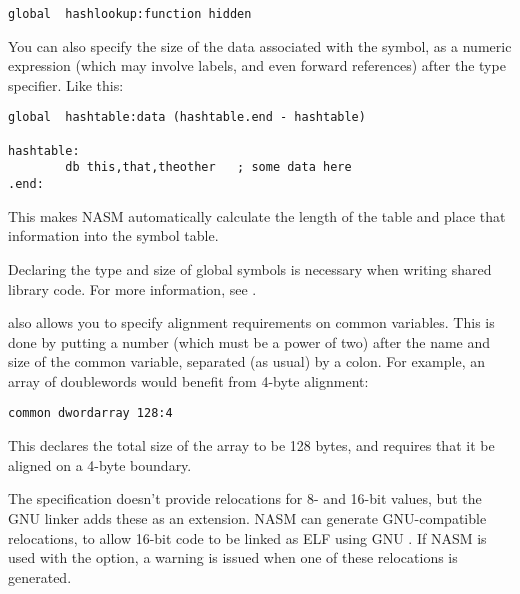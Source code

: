 \begin{lstlisting}
global  hashlookup:function hidden
\end{lstlisting}

You can also specify the size of the data associated with the
symbol, as a numeric expression (which may involve labels, and even
forward references) after the type specifier. Like this:

\begin{lstlisting}
global  hashtable:data (hashtable.end - hashtable)

hashtable:
        db this,that,theother   ; some data here
.end:
\end{lstlisting}

This makes NASM automatically calculate the length of the table and
place that information into the  symbol table.

Declaring the type and size of global symbols is necessary when
writing shared library code. For more information, see
.


 also allows you to specify alignment requirements
 on common variables.
This is done by putting a number (which must be a power of two)
after the name and size of the common variable, separated (as usual)
by a colon. For example, an array of doublewords would benefit from
4-byte alignment:

\begin{lstlisting}
common dwordarray 128:4
\end{lstlisting}

This declares the total size of the array to be 128 bytes, and
requires that it be aligned on a 4-byte boundary.


The  specification doesn't provide relocations for 8- and
16-bit values, but the GNU  linker adds these as an extension.
NASM can generate GNU-compatible relocations, to allow 16-bit code to
be linked as ELF using GNU . If NASM is used with the
 option, a warning is issued when one of
these relocations is generated.


